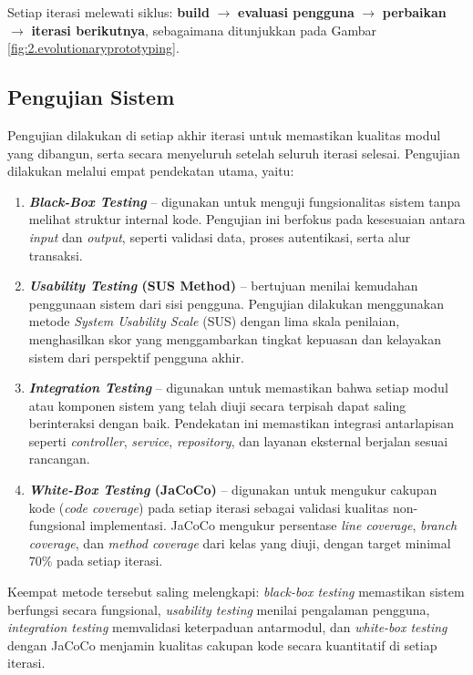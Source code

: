 Setiap iterasi melewati siklus: \textbf{build} $\rightarrow$ \textbf{evaluasi pengguna} $\rightarrow$ \textbf{perbaikan} $\rightarrow$ \textbf{iterasi berikutnya}, sebagaimana ditunjukkan pada Gambar \ref{fig:2.evolutionaryprototyping}.\par

\subsection{Pengujian Sistem} \label{III.PengujianSistem}
Pengujian dilakukan di setiap akhir iterasi untuk memastikan kualitas modul yang dibangun, serta secara menyeluruh setelah seluruh iterasi selesai. Pengujian dilakukan melalui empat pendekatan utama, yaitu:\par

\begin{enumerate}[noitemsep]
	\item \textbf{\textit{Black-Box Testing}} -- digunakan untuk menguji fungsionalitas sistem tanpa melihat struktur internal kode. Pengujian ini berfokus pada kesesuaian antara \textit{input} dan \textit{output}, seperti validasi data, proses autentikasi, serta alur transaksi.
	\item \textbf{\textit{Usability Testing} (SUS Method)} -- bertujuan menilai kemudahan penggunaan sistem dari sisi pengguna. Pengujian dilakukan menggunakan metode \textit{System Usability Scale} (SUS) dengan lima skala penilaian, menghasilkan skor yang menggambarkan tingkat kepuasan dan kelayakan sistem dari perspektif pengguna akhir.
	\item \textbf{\textit{Integration Testing}} -- digunakan untuk memastikan bahwa setiap modul atau komponen sistem yang telah diuji secara terpisah dapat saling berinteraksi dengan baik. Pendekatan ini memastikan integrasi antarlapisan seperti \textit{controller}, \textit{service}, \textit{repository}, dan layanan eksternal berjalan sesuai rancangan.
	\item \textbf{\textit{White-Box Testing} (JaCoCo)} -- digunakan untuk mengukur cakupan kode (\textit{code coverage}) pada setiap iterasi sebagai validasi kualitas non-fungsional implementasi. JaCoCo mengukur persentase \textit{line coverage}, \textit{branch coverage}, dan \textit{method coverage} dari kelas yang diuji, dengan target minimal 70\% pada setiap iterasi.
\end{enumerate}

Keempat metode tersebut saling melengkapi: \textit{black-box testing} memastikan sistem berfungsi secara fungsional, \textit{usability testing} menilai pengalaman pengguna, \textit{integration testing} memvalidasi keterpaduan antarmodul, dan \textit{white-box testing} dengan JaCoCo menjamin kualitas cakupan kode secara kuantitatif di setiap iterasi.\par

